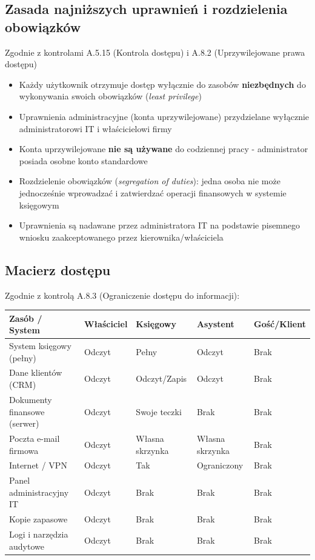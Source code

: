 \documentclass[12pt,a4paper]{article}
\providecommand{\tightlist}{\setlength{\itemsep}{0pt}\setlength{\parskip}{0pt}}
\begin{document}
\subsection{Zasada najniższych uprawnień i rozdzielenia obowiązków}\label{zasada}

Zgodnie z kontrolami A.5.15 (Kontrola dostępu) i A.8.2 (Uprzywilejowane prawa dostępu)

\begin{itemize}
\tightlist
\item
  Każdy użytkownik otrzymuje dostęp wyłącznie do zasobów \textbf{niezbędnych} do wykonywania swoich obowiązków (\textit{least privilege})
\item
  Uprawnienia administracyjne (konta uprzywilejowane) przydzielane wyłącznie administratorowi IT i właścicielowi firmy
\item
  Konta uprzywilejowane \textbf{nie są używane} do codziennej pracy - administrator posiada osobne konto standardowe
\item
  Rozdzielenie obowiązków (\textit{segregation of duties}): jedna osoba nie może jednocześnie wprowadzać i zatwierdzać operacji finansowych w systemie księgowym
\item
  Uprawnienia są nadawane przez administratora IT na podstawie pisemnego wniosku zaakceptowanego przez kierownika/właściciela
\end{itemize}
\newpage
\subsection{Macierz dostępu}\label{macierz-dostepu-szablon}

Zgodnie z kontrolą A.8.3 (Ograniczenie dostępu do informacji):

\begin{longtable}[]{@{}>{\raggedright\arraybackslash}p{}>{\raggedright\arraybackslash}p{}>{\raggedright\arraybackslash}p{}>{\raggedright\arraybackslash}p{}>{\raggedright\arraybackslash}p{}@{}}
\toprule\noalign{}
Zasób / System & Właściciel & Księgowy & Asystent & Gość/Klient \\
\midrule\noalign{}
\endhead
\bottomrule\noalign{}
\endlastfoot
System księgowy (pełny) & Odczyt & Pełny & Odczyt & Brak \\
Dane klientów (CRM) & Odczyt & Odczyt/Zapis & Odczyt & Brak \\
Dokumenty finansowe (serwer) & Odczyt & Swoje teczki & Brak & Brak \\
Poczta e-mail firmowa & Odczyt & Własna skrzynka & Własna skrzynka & Brak \\
Internet / VPN & Odczyt & Tak & Ograniczony & Brak \\
Panel administracyjny IT & Odczyt & Brak & Brak & Brak \\
Kopie zapasowe & Odczyt & Brak & Brak & Brak \\
Logi i narzędzia audytowe & Odczyt & Brak & Brak & Brak \\
\end{longtable}
\end{document}
